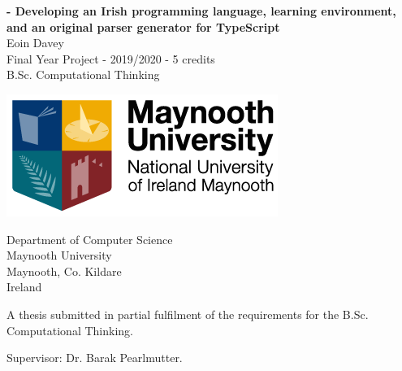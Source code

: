 \begin{titlepage}
    \begin{center}
        \begin{LARGE}
        \textbf{\Setanta{} - Developing an Irish programming language, learning environment, and an original parser generator for TypeScript}\\
            Eoin Davey\\
        Final Year Project - 2019/2020 - 5 credits\\
        B.Sc. Computational Thinking\\

        \vspace{10mm}

        \includegraphics[scale=0.66]{maynoothlogo}

        \vspace{25mm}

        Department of Computer Science\\
        Maynooth University\\
        Maynooth, Co. Kildare\\
        Ireland
        \end{LARGE}

        \vspace{20mm}

        \begin{large}A thesis submitted in partial fulfilment of the requirements for the B.Sc. Computational Thinking.\end{large}

        \begin{LARGE}Supervisor: Dr. Barak Pearlmutter.\end{LARGE}
    \end{center}
\end{titlepage}
